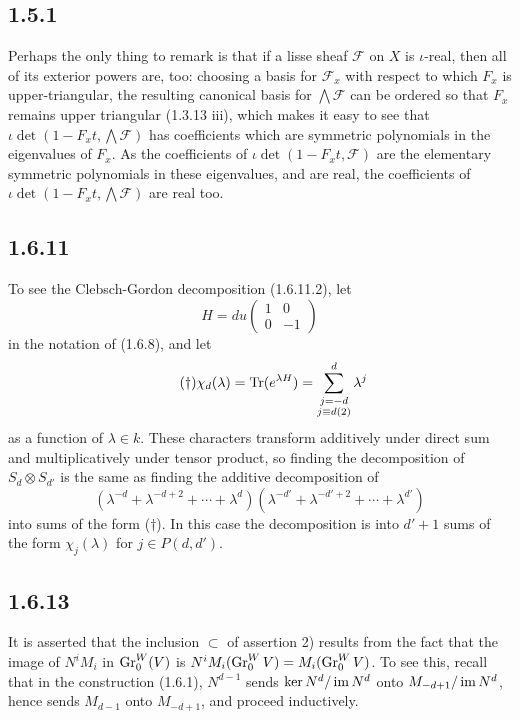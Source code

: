 \documentclass[deligne.tex]{subfiles}
\begin{document}
\subsection*{1.5.1} Perhaps the only thing to remark is that if a lisse 
sheaf $\mathscr F$ on $X$ is $\iota$-real, then all of its exterior powers 
are, too: choosing a basis for $\mathscr F_x$ with
respect to which $F_x$ is upper-triangular, the resulting canonical basis 
for $\bigwedge\mathscr F$ can be ordered so that $F_x$ remains upper 
triangular (1.3.13 iii),
which makes it easy to see that $\iota\det(1-F_x t,\bigwedge\mathscr F)$ has 
coefficients which are symmetric polynomials in the eigenvalues of $F_x$.
As the coefficients of $\iota\det(1-F_x t,\mathscr F)$ are the elementary 
symmetric polynomials in these eigenvalues, and are real, the coefficients
of $\iota\det(1-F_x t,\bigwedge\mathscr F)$ are real too.

\subsection*{1.6.11} To see the Clebsch-Gordon decomposition (1.6.11.2),
let
\begin{equation*} H=du\begin{pmatrix}
	1&0\\0&-1
\end{pmatrix} \end{equation*}
in the notation of (1.6.8), and let 
\begin{equation*}\tag{$\dagger$}
	\chi_d(\lambda)=\operatorname{Tr}(e^{\lambda H})=\sum_{\substack{j=-d \\ j\equiv d(2)}}^d \lambda^j
\end{equation*}
as a function of $\lambda\in k$. These characters transform additively under
direct sum and multiplicatively under tensor product, so finding the
decomposition of $S_d\otimes S_{d'}$ is the same as finding the additive
decomposition of
\begin{equation*}
	(\lambda^{-d}+\lambda^{-d+2}+\cdots+\lambda^d)	(\lambda^{-d'}+\lambda^{-d'+2}+\cdots+\lambda^{d'})
\end{equation*}
into sums of the form ($\dagger$). In this case the decomposition is into
$d'+1$ sums of the form $\chi_j(\lambda)$ for $j\in P(d,d')$.

\subsection*{1.6.13} It is asserted that the inclusion $\subset$ of 
assertion 2) results from the fact that the image of $N^iM_i$ in
$\operatorname{Gr}^W_0(V)$ is $N^iM_i(\operatorname{Gr}_0^WV)=M_i(\operatorname{Gr}_0^WV)$. To see this, recall that 
in the construction (1.6.1), $N^{d-1}$ sends $\ker N^d/\operatorname{im} N^d$ onto
$M_{-d+1}/\operatorname{im} N^d$, hence sends $M_{d-1}$ onto $M_{-d+1}$, and proceed
inductively.
\end{document}
